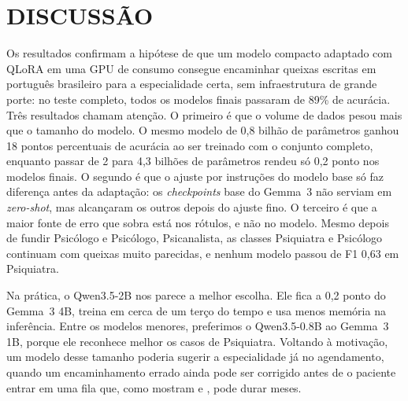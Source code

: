 \documentclass{ieeeaccess}
\begin{document}
\section{DISCUSS\~AO}
\label{sec:discussao}
Os resultados confirmam a hip\'otese de que um modelo compacto adaptado com QLoRA em uma GPU de consumo consegue encaminhar queixas escritas em portugu\^es brasileiro para a especialidade certa, sem infraestrutura de grande porte: no teste completo, todos os modelos finais passaram de 89\% de acur\'acia. Tr\^es resultados chamam aten\c{c}\~ao. O primeiro \'e que o volume de dados pesou mais que o tamanho do modelo. O mesmo modelo de 0,8 bilh\~ao de par\^ametros ganhou 18 pontos percentuais de acur\'acia ao ser treinado com o conjunto completo, enquanto passar de 2 para 4,3 bilh\~oes de par\^ametros rendeu s\'o 0,2 ponto nos modelos finais. O segundo \'e que o ajuste por instru\c{c}\~oes do modelo base s\'o faz diferen\c{c}a antes da adapta\c{c}\~ao: os \emph{checkpoints} base do Gemma~3 n\~ao serviam em \emph{zero-shot}, mas alcan\c{c}aram os outros depois do ajuste fino. O terceiro \'e que a maior fonte de erro que sobra est\'a nos r\'otulos, e n\~ao no modelo. Mesmo depois de fundir Psic\'ologo e Psic\'ologo, Psicanalista, as classes Psiquiatra e Psic\'ologo continuam com queixas muito parecidas, e nenhum modelo passou de F1 0,63 em Psiquiatra.

Na pr\'atica, o Qwen3.5-2B nos parece a melhor escolha. Ele fica a 0,2 ponto do Gemma~3 4B, treina em cerca de um ter\c{c}o do tempo e usa menos mem\'oria na infer\^encia. Entre os modelos menores, preferimos o Qwen3.5-0.8B ao Gemma~3 1B, porque ele reconhece melhor os casos de Psiquiatra. Voltando \`a motiva\c{c}\~ao, um modelo desse tamanho poderia sugerir a especialidade j\'a no agendamento, quando um encaminhamento errado ainda pode ser corrigido antes de o paciente entrar em uma fila que, como mostram \cite{b3} e \cite{b4}, pode durar meses.
\end{document}

